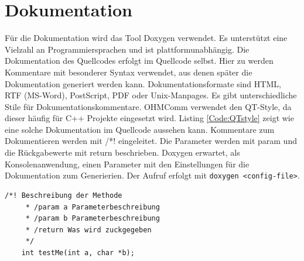 \section{Dokumentation}
Für die Dokumentation wird das Tool Doxygen verwendet. Es unterstützt eine Vielzahl an Programmiersprachen und ist plattformunabhängig. Die Dokumentation des Quellcodes erfolgt im Quellcode selbst. Hier zu werden Kommentare mit besonderer Syntax verwendet, aus denen später die Dokumentation generiert werden kann. Dokumentationsformate sind HTML, RTF (MS-Word), PostScript, PDF oder Unix-Manpages. Es gibt unterschiedliche Stile für Dokumentationskommentare. OHMComm verwendet den QT-Style, da dieser häufig für C++ Projekte eingesetzt wird. Listing \ref{Code:QTstyle} zeigt wie eine solche Dokumentation im Quellcode aussehen kann. Kommentare zum Dokumentieren werden mit /*! eingeleitet. Die Parameter werden mit \/param und die Rückgabewerte mit \/return beschrieben. Doxygen erwartet, als Konsolenanwendung, einen Parameter mit den Einstellungen für die Dokumentation zum Generierien. Der Aufruf erfolgt mit \texttt{doxygen <config-file>}.

\begin{lstlisting}[caption={Code-Dokumentation im QT-Style},label={Code:QTstyle}, numbers=none]
	/*! Beschreibung der Methode
	 * /param a Parameterbeschreibung
	 * /param b Parameterbeschreibung
	 * /return Was wird zuckgegeben
	 */ 
	int testMe(int a, char *b);
\end{lstlisting}